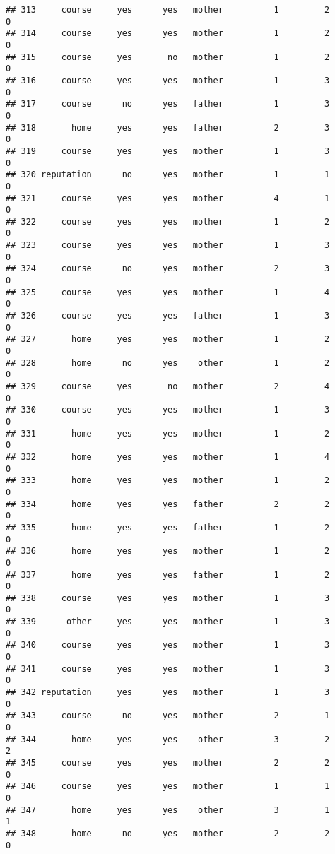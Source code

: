 \documentclass[]{article}
\begin{document}
\begin{verbatim}
## 313     course     yes      yes   mother          1         2        0
## 314     course     yes      yes   mother          1         2        0
## 315     course     yes       no   mother          1         2        0
## 316     course     yes      yes   mother          1         3        0
## 317     course      no      yes   father          1         3        0
## 318       home     yes      yes   father          2         3        0
## 319     course     yes      yes   mother          1         3        0
## 320 reputation      no      yes   mother          1         1        0
## 321     course     yes      yes   mother          4         1        0
## 322     course     yes      yes   mother          1         2        0
## 323     course     yes      yes   mother          1         3        0
## 324     course      no      yes   mother          2         3        0
## 325     course     yes      yes   mother          1         4        0
## 326     course     yes      yes   father          1         3        0
## 327       home     yes      yes   mother          1         2        0
## 328       home      no      yes    other          1         2        0
## 329     course     yes       no   mother          2         4        0
## 330     course     yes      yes   mother          1         3        0
## 331       home     yes      yes   mother          1         2        0
## 332       home     yes      yes   mother          1         4        0
## 333       home     yes      yes   mother          1         2        0
## 334       home     yes      yes   father          2         2        0
## 335       home     yes      yes   father          1         2        0
## 336       home     yes      yes   mother          1         2        0
## 337       home     yes      yes   father          1         2        0
## 338     course     yes      yes   mother          1         3        0
## 339      other     yes      yes   mother          1         3        0
## 340     course     yes      yes   mother          1         3        0
## 341     course     yes      yes   mother          1         3        0
## 342 reputation     yes      yes   mother          1         3        0
## 343     course      no      yes   mother          2         1        0
## 344       home     yes      yes    other          3         2        2
## 345     course     yes      yes   mother          2         2        0
## 346     course     yes      yes   mother          1         1        0
## 347       home     yes      yes    other          3         1        1
## 348       home      no      yes   mother          2         2        0

\end{verbatim}
\end{document}
